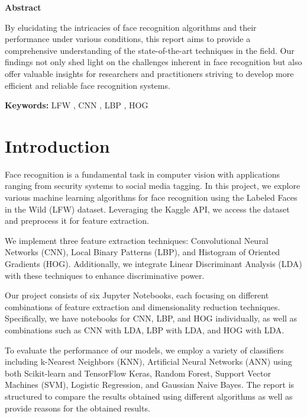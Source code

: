 \documentclass[a4paper]{article}
\theoremstyle{plain}
\theoremstyle{definition}
\renewenvironment{abstract}
 {\Large\textbf{Abstract}\vspace{0.5em}\par\noindent\ignorespaces}
 {\par\vspace{0.5em}}
\begin{document}
\begin  {abstract}
By elucidating the intricacies of face recognition algorithms and their performance under various conditions, this report aims to provide a comprehensive understanding of the state-of-the-art techniques in the field. Our findings not only shed light on the challenges inherent in face recognition but also offer valuable insights for researchers and practitioners striving to develop more efficient and reliable face recognition systems.\vspace{8pt}
	
		\noindent\textbf{Keywords:} LFW , CNN , LBP , HOG 
	\end{abstract}

	\tableofcontents
	
	\section{Introduction}
	\label{sec:intro}
  \fontsize{15}{15}\selectfont 
Face recognition is a fundamental task in computer vision with applications ranging from security systems to social media tagging. In this project, we explore various machine learning algorithms for face recognition using the Labeled Faces in the Wild (LFW) dataset. Leveraging the Kaggle API, we access the dataset and preprocess it for feature extraction.\vspace{8pt}

We implement three feature extraction techniques: Convolutional Neural Networks (CNN), Local Binary Patterns (LBP), and Histogram of Oriented Gradients (HOG). Additionally, we integrate Linear Discriminant Analysis (LDA) with these techniques to enhance discriminative power.\vspace{8pt}

Our project consists of six Jupyter Notebooks, each focusing on different combinations of feature extraction and dimensionality reduction techniques. Specifically, we have notebooks for CNN, LBP, and HOG individually, as well as combinations such as CNN with LDA, LBP with LDA, and HOG with LDA.\vspace{8pt}

To evaluate the performance of our models, we employ a variety of classifiers including k-Nearest Neighbors (KNN), Artificial Neural Networks (ANN) using both Scikit-learn and TensorFlow Keras, Random Forest, Support Vector Machines (SVM), Logistic Regression, and Gaussian Naive Bayes. The report is structured to compare the results obtained using different algorithms as well as provide reasons for the obtained results. \vspace{8pt}
\end{document}
